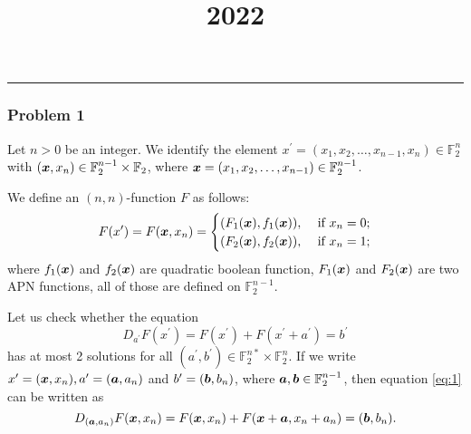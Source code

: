 \documentclass{article}
\title{ 2022 }
\newcommand{\F}{\mathbb{F}}
\begin{document}
  \noindent
  \rule{\linewidth}{0.4pt}
  
\subsubsection*{Problem 1}
    Let $ n>0 $ be an integer. We identify the element $ x^{\prime}=(x_1,x_2,\dots,x_{n-1},x_n)\in\F_2^n $ with $ (\vb*{x},x_n)\in\F_2^{n-1}\times\F_2 $, where $ \vb*{x}=(x_1,x_2,\dots,x_{n-1})\in\F_2^{n-1} $.

    We define an $ (n,n) $-function $ F $ as follows:
    \begin{equation}
        F(x^{\prime})=F(\vb*{x},x_n)=
            \begin{cases}
                (F_1(\vb*{x}),f_1(\vb*{x})),   & \text{ if } x_n=0;\\
                (F_2(\vb*{x}),f_2(\vb*{x})),   & \text{ if } x_n=1;\\
            \end{cases} 
        \end{equation}
    where $ f_1(\vb*{x}) $ and $ f_2(\vb*{x}) $ are quadratic boolean function, $ F_1(\vb*{x}) $ and $ F_2(\vb*{x}) $ are two APN functions, all of those are defined on $ \F_{2}^{n-1} $.

        Let us check whether the equation
        \begin{equation}\label{eq:1}
            D_{a^{\prime}}F(x^{\prime})=F(x^{\prime})+F(x^{\prime}+a^{\prime})=b^{\prime}
        \end{equation}
        has at most 2 solutions for all $ (a^{\prime},b^{\prime})\in\F_2^{n*}\times\F_{2}^{n} $. 
        If we write $ x^{\prime}=(\vb*{x},x_n),a^{\prime}=(\vb*{a},a_n) $ and $ b^{\prime}=(\vb*{b},b_n) $, 
        where $ \vb*{a},\vb*{b}\in\F_2^{n-1} $, then equation \eqref{eq:1} can be written as
         \begin{equation}\label{eq:2}
            D_{(\vb*{a},a_n)}F(\vb*{x},x_n)=F(\vb*{x},x_n)+F(\vb*{x}+\vb*{a},x_n+a_n)=(\vb*{b},b_n).
        \end{equation}
\end{document}
